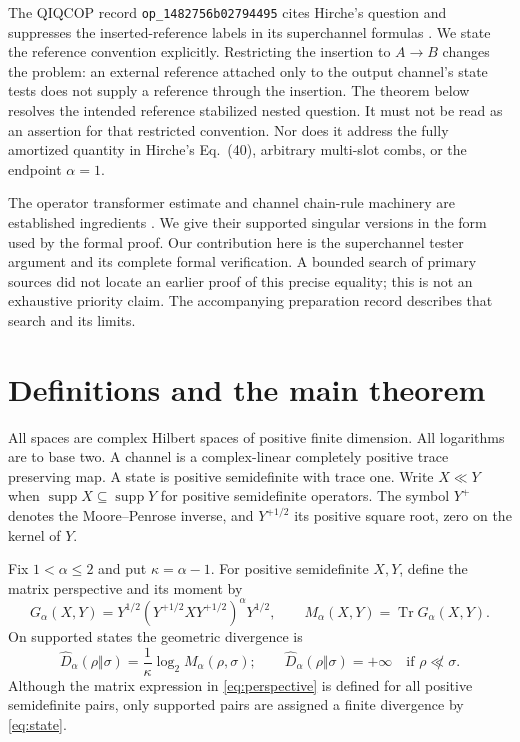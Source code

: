 \documentclass[11pt]{article}
\newcommand{\Tr}{\operatorname{Tr}}
\newcommand{\supp}{\operatorname{supp}}
\newcommand{\Dhat}{\widehat D}
\newcommand{\G}{G_\alpha}
\newcommand{\M}{M_\alpha}
\newcommand{\code}[1]{{\small\nolinkurl{#1}}}
\theoremstyle{remark}
\begin{document}
The QIQCOP record \code{op_1482756b02794495} cites Hirche's question and
suppresses the inserted-reference labels in its superchannel formulas
\cite{Zoo}. We state the reference convention explicitly. Restricting the
insertion to $A\to B$ changes the problem: an external reference attached only
to the output channel's state tests does not supply a reference through the
insertion. The theorem below resolves the intended reference stabilized
nested question. It must not be read as an assertion for that restricted
convention. Nor does it address the fully amortized quantity in Hirche's
Eq.~(40), arbitrary multi-slot combs, or the endpoint $\alpha=1$.

The operator transformer estimate and channel chain-rule machinery are
established ingredients \cite[Lemma~47 and Lemmas~5--7]{FF21}. We give their
supported singular versions in the form used by the formal proof. Our
contribution here is the superchannel tester argument and its complete formal
verification. A bounded search of primary sources did not locate an earlier
proof of this precise equality; this is not an exhaustive priority claim.
The accompanying preparation record describes that search and its limits.

\section{Definitions and the main theorem}
All spaces are complex Hilbert spaces of positive finite dimension. All
logarithms are to base two. A channel is a complex-linear completely positive
trace preserving map. A state is positive semidefinite with trace one. Write
$X\ll Y$ when $\supp X\subseteq\supp Y$ for positive semidefinite operators.
The symbol $Y^+$ denotes the Moore--Penrose inverse, and $Y^{+1/2}$ its positive
square root, zero on the kernel of $Y$.

Fix $1<\alpha\leq2$ and put $\kappa=\alpha-1$. For positive semidefinite $X,Y$,
define the matrix perspective and its moment by
\begin{equation}\label{eq:perspective}
 \G(X,Y)=Y^{1/2}(Y^{+1/2}XY^{+1/2})^\alpha Y^{1/2},
 \qquad \M(X,Y)=\Tr\G(X,Y).
\end{equation}
On supported states the geometric divergence is
\begin{equation}\label{eq:state}
 \Dhat_\alpha(\rho\Vert\sigma)=\frac{1}{\kappa}\log_2\M(\rho,\sigma);
 \qquad \Dhat_\alpha(\rho\Vert\sigma)=+\infty\quad\text{if }\rho\not\ll\sigma.
\end{equation}
Although the matrix expression in \eqref{eq:perspective} is defined for all
positive semidefinite pairs, only supported pairs are assigned a finite
divergence by \eqref{eq:state}.
\end{document}
